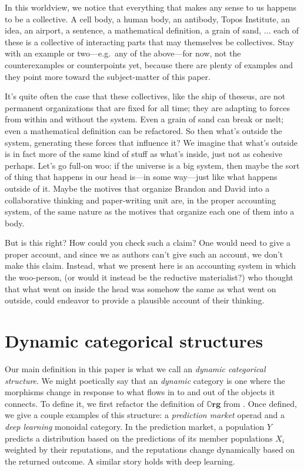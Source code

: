 \documentclass[11pt, one side, article]{memoir}
\theoremstyle{definition}
\theoremstyle{plain}
\newcommand{\Cat}[1]{\mathbf{#1}}%
\newcommand{\0}{\textsf{0}}
\newcommand{\1}{\tn{\textsf{1}}}
\newcommand{\org}{{\mathbb{O}\Cat{rg}}}
\begin{document}
In this worldview, we notice that everything that makes any sense to us happens to be a collective. A cell body, a human body, an antibody, Topos Institute, an idea, an airport, a sentence, a mathematical definition, a grain of sand, ... each of these is a collective of interacting parts that may themselves be collectives. Stay with an example or two---e.g.\ any of the above---for now, not the counterexamples or counterpoints yet, because there are plenty of examples and they point more toward the subject-matter of this paper.

It's quite often the case that these collectives, like the ship of theseus, are not permanent organizations that are fixed for all time; they are adapting to forces from within and without the system. Even a grain of sand can break or melt; even a mathematical definition can be refactored. So then what's outside the system, generating these forces that influence it? We imagine that what's outside is in fact more of the same kind of stuff as what's inside, just not as cohesive perhaps. Let's go full-on woo: if the universe is a big system, then maybe the sort of thing that happens in our head is---in some way---just like what happens outside of it. Maybe the motives that organize Brandon and David into a collaborative thinking and paper-writing unit are, in the proper accounting system, of the same nature as the motives that organize each one of them into a body. 

But is this right? How could you check such a claim? One would need to give a proper account, and since we as authors can't give such an account, we don't make this claim. Instead, what we present here is an accounting system in which the woo-person, (or would it instead be the reductive materialist?) who thought that what went on inside the head was somehow the same as what went on outside, could endeavor to provide a plausible account of their thinking.

\section{Dynamic categorical structures}

Our main definition in this paper is what we call an \emph{dynamic categorical structure}. We might poetically say that an \emph{dynamic} category is one where the morphisms change in response to what flows in to and out of the objects it connects. To define it, we first refactor the definition of $\org$ from \cite{spivak2021learners}. Once defined, we give a couple examples of this structure: a \emph{prediction market} operad and a \emph{deep learning} monoidal category. In the prediction market, a population $Y$ predicts a distribution based on the predictions of its member populations $X_i$ weighted by their reputations, and the reputations change dynamically based on the returned outcome. A similar story holds with deep learning.
\end{document}
